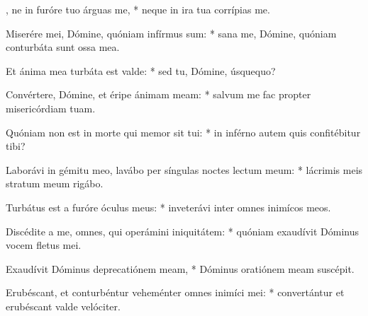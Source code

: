 \begin{psalmus}

, ne in furóre tuo árguas me, * neque in ira tua corrípias me.

Miserére mei, Dómine, quóniam infírmus sum: * sana me, Dómine, quóniam conturbáta sunt ossa mea.

Et ánima mea turbáta est valde: * sed tu, Dómine, úsquequo?

Convértere, Dómine, et éripe ánimam meam: * salvum me fac propter misericórdiam tuam.

Quóniam non est in morte qui memor sit tui: * in inférno autem quis confitébitur tibi?

Laborávi in gémitu meo, lavábo per síngulas noctes lectum meum: * lácrimis meis stratum meum rigábo.

Turbátus est a furóre óculus meus: * inveterávi inter omnes inimícos meos.

Discédite a me, omnes, qui operámini iniquitátem: * quóniam exaudívit Dóminus vocem fletus mei.

Exaudívit Dóminus deprecatiónem meam, * Dóminus oratiónem meam suscépit.

Erubéscant, et conturbéntur veheménter omnes inimíci mei: * convertántur et erubéscant valde velóciter.

\end{psalmus}
